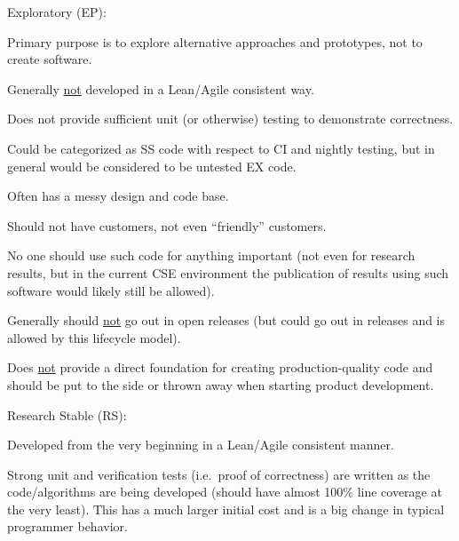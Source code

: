 \documentclass[11pt]{SANDreport}
\begin{document}
\begin{compactenum}

{}\item Exploratory (EP):

\begin{compactitem}

{}\item Primary purpose is to explore alternative approaches and
prototypes, not to create software.

{}\item Generally {}\underline{not} developed in a Lean/Agile
consistent way.

{}\item Does not provide sufficient unit (or otherwise) testing to
demonstrate correctness.

{}\item Could be categorized as SS code with respect to CI
and nightly testing, but in general would be considered to be untested
EX code.

{}\item Often has a messy design and code base.

{}\item Should not have  customers, not even ``friendly'' customers.

{}\item No one should use such code for anything important (not even
for research results, but in the current CSE environment the
publication of results using such software would likely still be
allowed).

{}\item Generally should {}\underline{not} go out in open releases
(but could go out in releases and is allowed by this lifecycle model).

{}\item Does {}\underline{not} provide a direct foundation for
creating production-quality code and should be put to the side or
thrown away when starting product development.

\end{compactitem}

{}\item Research Stable (RS):

\begin{compactitem}

{}\item Developed from the very beginning in a Lean/Agile consistent
manner.

{}\item Strong unit and verification tests (i.e.\ proof of
correctness) are written as the code/algorithms are being developed
(should have almost 100\% line coverage at the very least).  This has
a much larger initial cost and is a big change in typical programmer
behavior.


\end{compactitem}
\end{compactenum}
\end{document}

